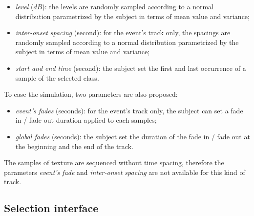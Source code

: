 \documentclass[twoside,twocolumn]{article}
\begin{document}
\begin{itemize}
\item \emph{level} ($dB$): the levels are  randomly sampled according to a normal distribution parametrized by the subject in terms of mean value and variance;
\item \emph{inter-onset spacing} (second): for the event's track only, the spacings are randomly sampled according to a normal distribution parametrized by the subject in terms of mean value and variance;
\item \emph{start and end time} (second): the subject set the first and last occurrence of a sample of the selected class.
\end{itemize}


To ease the simulation, two parameters are also proposed:


\begin{itemize}
\item \emph{event's fades} (seconds): for the event's track only, the subject can set a fade in / fade out duration applied to each samples;
\item \emph{global fades} (seconds): the subject set the duration of the fade in / fade out at the beginning and the end of the track.
\end{itemize}


The samples of texture are sequenced without time spacing, therefore the parameters \emph{event's fade} and \emph{inter-onset spacing} are not available for this kind of track.

\subsection{Selection interface}
\label{sec:simscene_ssf}
\end{document}
